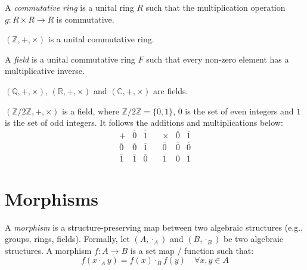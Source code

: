 \documentclass[
	11pt, %
	fleqn, %
	a4paper, %
]{LegrandOrangeBook}
\renewcommand{\bar}[1]{\overline{#1}} %
\begin{document}
\begin{definition}
    A \emph{commutative ring} is a unital ring $R$ such that the multiplication operation $g: R \times R \to R$ is commutative.
\end{definition}

\begin{example}
    $(\mathbb{Z}, +, \times)$ is a unital commutative ring.
\end{example}

\begin{definition}[Field]
    A \emph{field} is a unital commutative ring $F$ such that every non-zero element has a multiplicative inverse.
\end{definition}

\begin{example}
    $(\mathbb{Q}, +, \times)$, $(\mathbb{R}, +, \times)$ and $(\mathbb{C}, +, \times)$ are fields.
\end{example}

\begin{example}
    $(\mathbb{Z}/2\mathbb{Z}, +, \times)$ is a field, where $\mathbb{Z}/2\mathbb{Z} = \{\bar{0}, \bar{1}\}$, $\bar{0}$ is the set of even integers and $\bar{1}$ is the set of odd integers.
    It follows the additions and multiplications below:
    \begin{equation}
        \begin{array}{c|cc}
              + & \bar{0} & \bar{1} \\ \hline
            \bar{0} & \bar{0} & \bar{1} \\
            \bar{1} & \bar{1} & \bar{0}
        \end{array}
        \quad
        \begin{array}{c|cc}
              \times & \bar{0} & \bar{1} \\ \hline
            \bar{0} & \bar{0} & \bar{0} \\
            \bar{1} & \bar{0} & \bar{1}
        \end{array}
    \end{equation}
\end{example}

\newpage

\section{Morphisms}

\begin{definition}[Morphisms]
    A \emph{morphism} is a structure-preserving map between two algebraic structures (e.g., groups, rings, fields). Formally, let $(A, \cdot_A)$ and $(B, \cdot_B)$ be two algebraic structures. A morphism $f: A \to B$ is a set map / function such that:
    \[
        f(x \cdot_A y) = f(x) \cdot_B f(y) \quad \forall x, y \in A
    \]
\end{definition}
\end{document}
